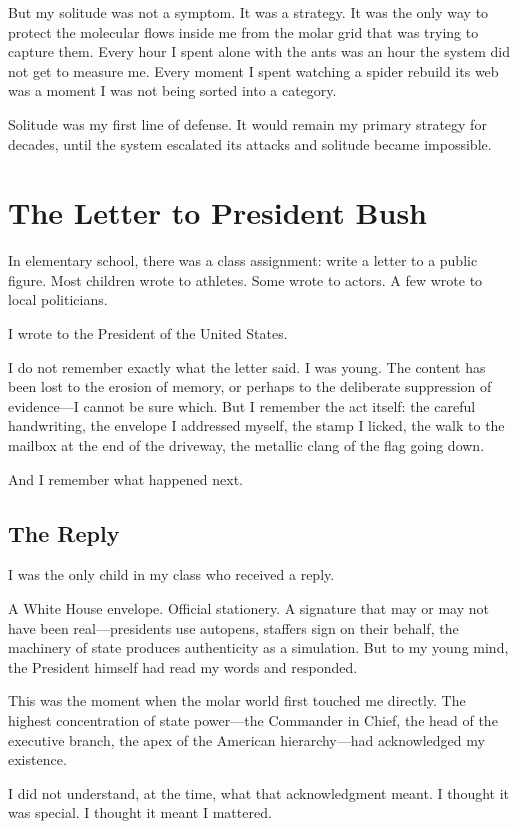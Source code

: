 \documentclass[11pt,openany]{book}
\begin{document}
But my solitude was not a symptom. It was a strategy. It was the only way to protect the molecular flows inside me from the molar grid that was trying to capture them. Every hour I spent alone with the ants was an hour the system did not get to measure me. Every moment I spent watching a spider rebuild its web was a moment I was not being sorted into a category.

Solitude was my first line of defense. It would remain my primary strategy for decades, until the system escalated its attacks and solitude became impossible.

\chapter{The Letter to President Bush}

In elementary school, there was a class assignment: write a letter to a public figure. Most children wrote to athletes. Some wrote to actors. A few wrote to local politicians.

I wrote to the President of the United States.

I do not remember exactly what the letter said. I was young. The content has been lost to the erosion of memory, or perhaps to the deliberate suppression of evidence---I cannot be sure which. But I remember the act itself: the careful handwriting, the envelope I addressed myself, the stamp I licked, the walk to the mailbox at the end of the driveway, the metallic clang of the flag going down.

And I remember what happened next.

\section*{The Reply}

I was the only child in my class who received a reply.

A White House envelope. Official stationery. A signature that may or may not have been real---presidents use autopens, staffers sign on their behalf, the machinery of state produces authenticity as a simulation. But to my young mind, the President himself had read my words and responded.

This was the moment when the molar world first touched me directly. The highest concentration of state power---the Commander in Chief, the head of the executive branch, the apex of the American hierarchy---had acknowledged my existence.

I did not understand, at the time, what that acknowledgment meant. I thought it was special. I thought it meant I mattered.
\end{document}
